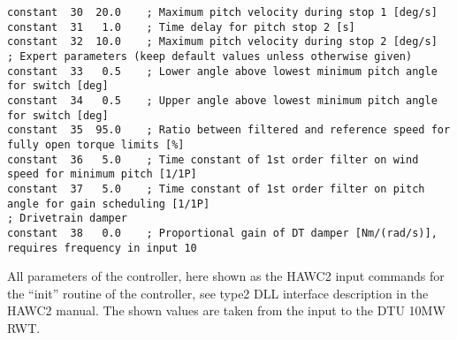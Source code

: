 \begin{table}[b]
\begin{center}
\begin{verbatim}
constant  30  20.0    ; Maximum pitch velocity during stop 1 [deg/s]
constant  31   1.0    ; Time delay for pitch stop 2 [s]
constant  32  10.0    ; Maximum pitch velocity during stop 2 [deg/s]
; Expert parameters (keep default values unless otherwise given)
constant  33   0.5    ; Lower angle above lowest minimum pitch angle for switch [deg]
constant  34   0.5    ; Upper angle above lowest minimum pitch angle for switch [deg]
constant  35  95.0    ; Ratio between filtered and reference speed for fully open torque limits [%]
constant  36   5.0    ; Time constant of 1st order filter on wind speed for minimum pitch [1/1P]
constant  37   5.0    ; Time constant of 1st order filter on pitch angle for gain scheduling [1/1P]
; Drivetrain damper
constant  38   0.0    ; Proportional gain of DT damper [Nm/(rad/s)], requires frequency in input 10
\end{verbatim}
\caption{All parameters of the controller, here shown as the HAWC2 input commands for the ``init'' routine of the controller, see type2 DLL interface description in the HAWC2 manual. The shown values are taken from the input to the DTU 10MW RWT. \label{t:init}}
\end{center}
\end{table}

